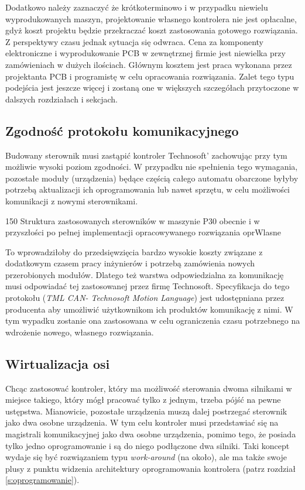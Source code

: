 Dodatkowo należy zaznaczyć że krótkoterminowo i w przypadku niewielu wyprodukowanych maszyn, projektowanie własnego kontrolera nie jest opłacalne, gdyż koszt projektu będzie przekraczać koszt zastosowania gotowego rozwiązania. Z perspektywy czasu jednak sytuacja się odwraca. Cena za komponenty elektroniczne i wyprodukowanie PCB w zewnętrznej firmie jest niewielka przy zamówieniach w dużych ilościach. Głównym kosztem jest praca wykonana przez projektanta PCB i programistę w celu opracowania rozwiązania. Zalet tego typu podejścia jest jeszcze więcej i zostaną one w większych szczegółach przytoczone w dalszych rozdziałach i sekcjach.

\subsection{Zgodność protokołu komunikacyjnego}

Budowany sterownik musi zastąpić kontroler Technosoft' zachowując przy tym możliwie wysoki poziom zgodności. W przypadku nie spełnienia tego wymagania, pozostałe moduły (urządzenia) będące częścią całego automatu obarczone byłyby potrzebą aktualizacji ich oprogramowania lub nawet sprzętu, w celu możliwości komunikacji z nowymi sterownikami. 

	{150}
	{Struktura zastosowanych sterowników w maszynie P30 obecnie i w przyszłości po pełnej implementacji opracowywanego rozwiązania}
	{oprWlasne}

To wprowadziłoby do przedsięwzięcia bardzo wysokie koszty związane z dodatkowym czasem pracy inżynierów i potrzebą zamówienia nowych przerobionych modułów. Dlatego też warstwa odpowiedzialna za komunikację musi odpowiadać tej zastosowanej przez firmę Technosoft. Specyfikacja do tego protokołu ({\it TML CAN- Technosoft Motion Language}) jest udostępniana przez producenta aby umożliwić użytkownikom ich produktów komunikację z nimi. W tym wypadku zostanie ona zastosowana w celu  ograniczenia czasu potrzebnego na wdrożenie nowego, własnego rozwiązania.

\subsection{Wirtualizacja osi}
\label{ss:axis_virtualisation}

Chcąc zastosować kontroler, który ma możliwość sterowania dwoma silnikami w miejsce takiego, który mógł pracować tylko z jednym, trzeba pójść na pewne ustępstwa. Mianowicie, pozostałe urządzenia muszą dalej postrzegać sterownik jako dwa osobne urządzenia. W tym celu kontroler musi przedstawiać się na magistrali komunikacyjnej jako dwa osobne urządzenia, pomimo tego, że posiada tylko jedno oprogramowanie i są do niego podłączone dwa silniki. Taki koncept wydaje się być rozwiązaniem typu {\it work-around} (na około), ale ma także swoje plusy z punktu widzenia architektury oprogramowania kontrolera (patrz rozdział \ref{s:oprogramowanie}). \\

